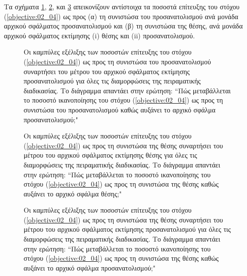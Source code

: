 Τα σχήματα \ref{fig:02_04_05:10}, \ref{fig:02_04_05:11}, και
\ref{fig:02_04_05:12} απεικονίζουν αντίστοιχα τα ποσοστά επίτευξης του στόχου
(\ref{objective:02_04}) ως προς (α) τη συνιστώσα του προσανατολισμού ανά μονάδα
αρχικού σφάλματος προσανατολισμού και (β) τη συνιστώσα της θέσης, ανά μονάδα
αρχικού σφάλματος εκτίμησης (i) θέσης και (ii) προσανατολισμού.

\begin{figure}\centering
  \vspace{2cm}
  
  \vspace{1.5cm}
  \caption{\small Οι καμπύλες εξέλιξης των ποσοστών επίτευξης του στόχου
           (\ref{objective:02_04}) ως προς τη συνιστώσα του προσανατολισμού
           συναρτήσει του μέτρου του αρχικού σφάλματος εκτίμησης
           προσανατολισμού για όλες τις διαμορφώσεις της πειραματικής
           διαδικασίας. Το διάγραμμα απαντάει στην ερώτηση: ``Πώς μεταβάλλεται
           το ποσοστό ικανοποίησης του στόχου (\ref{objective:02_04}) ως προς
           τη συνιστώσα του προσανατολισμού καθώς αυξάνει το αρχικό σφάλμα
           προσανατολισμού;"}
  \label{fig:02_04_05:10}
\end{figure}

\begin{figure}\centering
  \vspace{2cm}
  
  \vspace{1.5cm}
  \caption{\small Οι καμπύλες εξέλιξης των ποσοστών επίτευξης του στόχου
           (\ref{objective:02_04}) ως προς τη συνιστώσα της θέσης συναρτήσει
           του μέτρου του αρχικού σφάλματος εκτίμησης θέσης για όλες τις
           διαμορφώσεις της πειραματικής διαδικασίας.  Το διάγραμμα απαντάει
           στην ερώτηση: ``Πώς μεταβάλλεται το ποσοστό ικανοποίησης του στόχου
           (\ref{objective:02_04}) ως προς τη συνιστώσα της θέσης καθώς αυξάνει
           το αρχικό σφάλμα θέσης;"}
  \label{fig:02_04_05:11}
\end{figure}


\begin{figure}\centering
  \vspace{2cm}
  
  \vspace{1.5cm}
  \caption{\small Οι καμπύλες εξέλιξης των ποσοστών επίτευξης του στόχου
           (\ref{objective:02_04}) ως προς τη συνιστώσα της θέσης συναρτήσει
           του μέτρου του αρχικού σφάλματος εκτίμησης προσανατολισμού για όλες
           τις διαμορφώσεις της πειραματικής διαδικασίας. Το διάγραμμα απαντάει
           στην ερώτηση: ``Πώς μεταβάλλεται το ποσοστό ικανοποίησης του στόχου
           (\ref{objective:02_04}) ως προς τη συνιστώσα της θέσης καθώς αυξάνει
           το αρχικό σφάλμα προσανατολισμού;"}
  \label{fig:02_04_05:12}
\end{figure}

